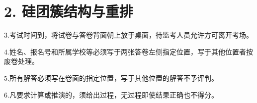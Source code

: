 \section*{2. 硅团簇结构与重排}
3.考试时间到，将试卷与答卷背面朝上放于桌面，待监考人员允许方可离开考场。

4.姓名、报名号和所属学校等必须写于两张答卷左侧指定位置，写于其他位置者按废卷处理。

5.所有解答必须写在卷面的指定位置，写于其他位置的解答不予评判。

6.凡要求计算或推演的，须给出过程，无过程即使结果正确也不得分。
